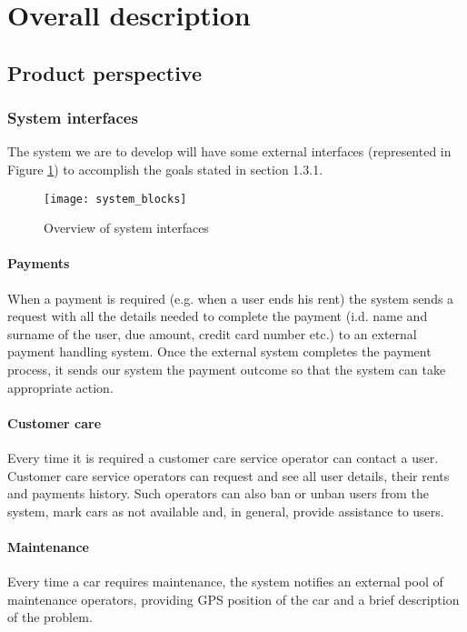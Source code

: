 \section{Overall description}
\subsection{Product perspective}
	\subsubsection{System interfaces}\label{sec:systemInterfaces}
		The system we are to develop will have some external interfaces (represented in Figure \ref{fig:systemInterfaces}) to accomplish the goals stated in section 1.3.1.
		\begin{figure}[h]
			\centering
			\texttt{[image: system\_blocks]}
			\caption{
				\label{fig:systemInterfaces} 
				Overview of system interfaces
			}
		\end{figure}
	\paragraph{Payments}
	When a payment is required (e.g. when a user ends his rent) the system sends a request with all the details needed to complete the payment (i.d. name and surname of the user, due amount, credit card number etc.) to an external payment handling system. Once the external system completes the payment process, it sends our system the payment outcome so that the system can take appropriate action.
	
	\paragraph{Customer care} Every time it is required a customer care service operator can contact a user. Customer care service operators can request and see all user details, their rents and payments history. Such operators can also ban or unban users from the system, mark cars as not available and, in general, provide assistance to users.

	\paragraph{Maintenance} Every time a car requires maintenance, the system notifies an external pool of maintenance operators, providing  GPS position of the car and a brief description of the problem.

